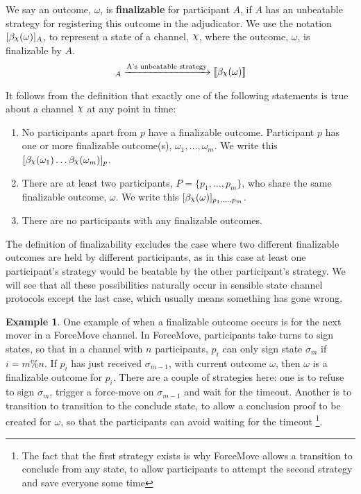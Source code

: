 \documentclass{article}
\DeclareRobustCommand{\rchi}{{\mathpalette\irchi\relax}}
\newcommand{\irchi}[2]{\raisebox{\depth}{$#1\chi$}} %
\theoremstyle{definition}
\newtheorem{example}{Example}[section]
\newcommand{\adj}[1]{\llbracket #1 \rrbracket}
\newcommand{\enf}[1]{[#1]}
\begin{document}
We say an outcome, $\omega$, is \textbf{finalizable} for participant $A$, if $A$ has an unbeatable
strategy for registering this outcome in the adjudicator.
We use the notation $\enf{\beta_\rchi(\omega)}_A$, to represent a state of a channel, $\rchi$,
where the outcome, $\omega$, is finalizable by $A$.
\begin{align*}
  \enf{\beta_\rchi(\omega)}_A \xrightarrow{\text{A's unbeatable strategy}} \adj{\beta_\rchi(\omega)}
\end{align*}

It follows from the definition that exactly one of the following statements is true about
a channel $\rchi$ at any point in time:
\begin{enumerate}
  \item No participants apart from $p$ have a finalizable outcome.
        Participant $p$ has one or more finalizable outcome(s), $\omega_1, \dots, \omega_m$.
        We write this $\enf{\beta_\rchi(\omega_1) \dots \beta_\rchi(\omega_m)}_p$.
  \item There are at least two participants, $P = \{p_1, \dots, p_m \}$, who share the same
        finalizable outcome, $\omega$. We write this $\enf{\beta_\rchi(\omega)}_{p_1, \dots, p_m}$.
  \item There are no participants with any finalizable outcomes.
\end{enumerate}
The definition of finalizability excludes the case where two different finalizable outcomes are held
by different participants, as in this case at least one participant's strategy would be beatable
by the other participant's strategy.
We will see that all these possibilities naturally occur in sensible state channel protocols
except the last case, which usually means something has gone wrong. 

\begin{example}
One example of when a finalizable outcome occurs is for the next mover in a ForceMove channel.
In ForceMove, participants take turns to sign states, so that in a channel with $n$ participants,
$p_i$ can only sign state $\sigma_m$ if $i = m \% n$.
If $p_i$ has just received $\sigma_{m-1}$, with current outcome $\omega$, then $\omega$
is a finalizable outcome for $p_i$.
There are a couple of strategies here: one is to refuse to sign $\sigma_m$, trigger a force-move
on $\sigma_{m-1}$ and wait for the timeout. 
Another is to transition to transition to the conclude state, to allow a conclusion proof
to be created for $\omega$, so that the participants can avoid waiting for the timeout
\footnote{The fact that the first strategy exists is why ForceMove allows a transition to
conclude from any state, to allow participants to attempt the second strategy and save everyone some time}.
\end{example}
\end{document}
